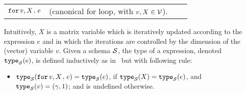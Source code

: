 \begin{tabular}{lcll}
 $\texttt{for}\, v,X \texttt{.}\, e$ & (canonical for loop, with $v, X \in \mathcal{V}$). 
\end{tabular}

\medskip
Intuitively, $X$ is a matrix variable which is iteratively updated according to the expression $e$ and in which the iterations are controlled by the dimension of the (vector) variable $v$. Given a schema $\mathcal{S}$, the type of a \langfor expression, denoted $\texttt{type}_{\mathcal{S}}(e)$, is defined inductively as in \lang\, but with following rule:
\begin{itemize}
\item $\texttt{type}_{\mathcal{S}}(\texttt{for}\, v,X \texttt{.}\, e) = \texttt{type}_{\mathcal{S}}(e)$, if $\texttt{type}_{\mathcal{S}}(X) = \texttt{type}_{\mathcal{S}}(e)$, and $\texttt{type}_{\mathcal{S}}(v) = (\gamma,1)$; and is undefined otherwise.
\end{itemize}



